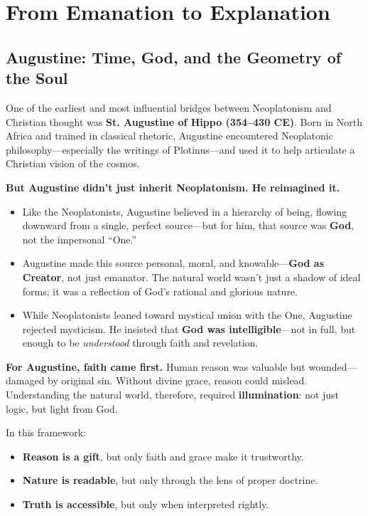 \section{From Emanation to Explanation}

\subsection{Augustine: Time, God, and the Geometry of the Soul}

One of the earliest and most influential bridges between Neoplatonism and Christian thought was \textbf{St. Augustine of Hippo (354–430 CE)}. Born in North Africa and trained in classical rhetoric, Augustine encountered Neoplatonic philosophy—especially the writings of Plotinus—and used it to help articulate a Christian vision of the cosmos.

\textbf{But Augustine didn’t just inherit Neoplatonism. He reimagined it.}

\begin{itemize}
  \item Like the Neoplatonists, Augustine believed in a hierarchy of being, flowing downward from a single, perfect source—but for him, that source was \textbf{God}, not the impersonal “One.”
  \item Augustine made this source personal, moral, and knowable—\textbf{God as Creator}, not just emanator. The natural world wasn’t just a shadow of ideal forms; it was a reflection of God’s rational and glorious nature.
  \item While Neoplatonists leaned toward mystical union with the One, Augustine rejected mysticism. He insisted that \textbf{God was intelligible}—not in full, but enough to be \emph{understood} through faith and revelation.
\end{itemize}

\textbf{For Augustine, faith came first.} Human reason was valuable but wounded—damaged by original sin. Without divine grace, reason could mislead. Understanding the natural world, therefore, required \textbf{illumination}: not just logic, but light from God.

In this framework:

\begin{itemize}
  \item \textbf{Reason is a gift}, but only faith and grace make it trustworthy.
  \item \textbf{Nature is readable}, but only through the lens of proper doctrine.
  \item \textbf{Truth is accessible}, but only when interpreted rightly.
\end{itemize}

